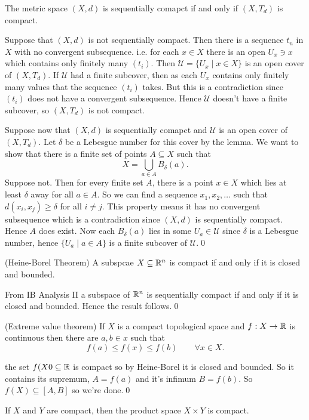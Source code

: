 \documentclass{article}
\begin{document}
\begin{theorem}
	The metric space $ (X,d) $ is sequentially comapct if and only if $ (X,T_d) $ is compact.
\end{theorem}
\pf Suppose that $ (X,d) $ is not sequentially compact. Then there is a sequence $ t_n $ in $ X $ with no convergent subsequence. i.e. for each $ x\in X $ there is an open $ U_x\ni x $ which contains only finitely many $ (t_i) $. Then $ \mathcal U =\{U_x \mid x\in X\} $ is an open cover of $ (X,T_d) $. If $ \mathcal U $ had a finite subcover, then as each $ U_x $ contains only finitely many values that the sequence $ (t_i) $ takes. But this is a contradiction since $ (t_i) $ does not have a convergent subsequence. Hence $ \mathcal U $ doesn't have a finite subcover, so $ (X,T_d) $ is not compact.\par
Suppose now that $ (X,d) $ is sequentially comapct and $ \mathcal U $ is an open cover of $ (X,T_d) $. Let $ \delta $ be a Lebesgue number for this cover by the lemma.	We want to show that there is a finite set of points $ A\subseteq X $ such that
\[
	X = \bigcup_{a\in A} B_\delta (a).
\]
Suppose not. Then for every finite set $ A $, there is a point $ x\in X $ which lies at least $ \delta $ away for all $ a\in A $. So we can find a sequence $ x_1,x_2,\dots $ such that $ d(x_i,x_j) \ge \delta $ for all $ i\ne j $. This property means it has no convergent subsequence which is a contradiction since $ (X,d) $ is sequentially compact. Hence $ A $ does exist. Now each $ B_\delta(a) $ lies in some $ U_a \in \mathcal U $ since $ \delta $ is a Lebesgue number, hence $ \{U_a\mid a\in A\} $ is a finite subcover of $ \mathcal U $.\qed
\begin{corollary}
	(Heine-Borel Theorem) A subspcae $ X\subseteq \mathbb{R}^n $ is compact if and only if it is closed and bounded.
\end{corollary}
\pf From IB Analysis II a subspace of $ \mathbb{R}^n $ is sequentially compact if and only if it is closed and bounded. Hence the result follows.\qed
\begin{corollary}
	(Extreme value theorem) If $ X $ is a compact topological space and $ f:X\to\mathbb{R} $ is continuous then there are $ a,b\in x $ such that
	\[
	  f(a)\le f(x) \le f(b)\qquad \forall x\in X.
	\]
\end{corollary}
\pf the set $ f(X0\subseteq\mathbb{R} $ is compact so by Heine-Borel it is closed and bounded. So it contains its supremum, $ A = f(a) $ and it's infimum $ B=f(b) $. So $ f(X)\subseteq [A,B] $ so we're done.\qed
\begin{theorem}
  If $ X $ and $ Y $ are compact, then the product space $ X\times Y $ is compact.
\end{theorem}
\end{document}
